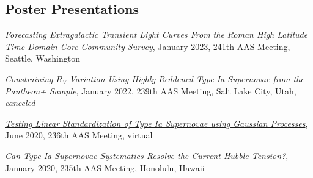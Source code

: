 \documentclass[margin]{res}
\begin{document}
\begin{resume}





\section{Poster Presentations}


\hangindent=15pt 
{\sl Forecasting Extragalactic Transient Light Curves From the Roman High Latitude Time Domain Core Community Survey}, January 2023, 241th AAS Meeting, Seattle, Washington
\vspace{-12pt}

\hangindent=15pt 
{\sl Constraining $R_V$ Variation Using Highly Reddened Type Ia Supernovae from the Pantheon+ Sample}, January 2022, 239th AAS Meeting, Salt Lake City, Utah, \textit{canceled}
\vspace{-12pt}


\hangindent=15pt 
\href{https://aas236-aas.ipostersessions.com/default.aspx?s=02-A5-6C-28-27-98-74-49-ED-38-21-BF-C2-85-DA-39}{\sl Testing Linear Standardization of Type Ia Supernovae using Gaussian Processes}, June 2020, 236th AAS Meeting, virtual
\vspace{-12pt}

\hangindent=15pt 
{\sl Can Type Ia Supernovae Systematics Resolve the Current Hubble Tension?}, January 2020, 235th AAS Meeting, Honolulu, Hawaii
\vspace{-12pt}


\end{resume}
\end{document}
